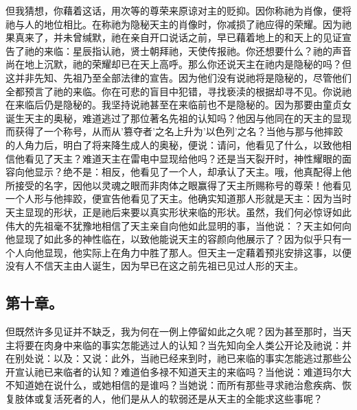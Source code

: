 但我猜想，你藉着这话，用次等的尊荣来原谅对主的贬抑。因你称祂为肖像，便将祂与人的地位相比。在称祂为隐秘天主的肖像时，你减损了祂应得的荣耀。因为祂果真来了，并未曾缄默，祂在亲自开口说话之前，早已藉着地上的和天上的见证宣告了祂的来临：星辰指认祂，贤士朝拜祂，天使传报祂。你还想要什么？祂的声音尚在地上沉默，祂的荣耀却已在天上高呼。那么你还说天主在祂内是隐秘的吗？但这并非先知、先祖乃至全部法律的宣告。因为他们没有说祂将是隐秘的，尽管他们全都预言了祂的来临。你在可悲的盲目中犯错，寻找亵渎的根据却寻不见。你说祂在来临后仍是隐秘的。我坚持说祂甚至在来临前也不是隐秘的。因为那要由童贞女诞生天主的奥秘，难道逃过了那位著名先祖的认知吗？他因与他同在的天主的显现而获得了一个称号，从而从'篡夺者'之名上升为'以色列'之名？当他与那与他摔跤的人角力后，明白了将来降生成人的奥秘，便说：请问，他看见了什么，以致他相信他看见了天主？难道天主在雷电中显现给他吗？还是当天裂开时，神性耀眼的面容向他显示？绝不是：相反，他看见了一个人，却承认了天主。哦，他真配得上他所接受的名字，因他以灵魂之眼而非肉体之眼赢得了天主所赐称号的尊荣！他看见一个人形与他摔跤，便宣告他看见了天主。他确实知道那人形就是天主：因为当时天主显现的形状，正是祂后来要以真实形状来临的形状。虽然，我们何必惊讶如此伟大的先祖毫不犹豫地相信了天主亲自向他如此显明的事，当他说：？天主如何向他显现了如此多的神性临在，以致他能说天主的容颜向他展示了？因为似乎只有一个人向他显现，他实际上在角力中胜了那人。但天主一定藉着预兆安排这事，以便没有人不信天主由人诞生，因为早已在这之前先祖已见过人形的天主。\par


\subsection{第十章。}

\par

但既然许多见证并不缺乏，我为何在一例上停留如此之久呢？因为甚至那时，当天主将要在肉身中来临的事实怎能逃过人的认知？当先知向全人类公开论及祂说：并在别处说：以及：又说：此外，当祂已经来到时，祂已来临的事实怎能逃过那些公开宣认祂已来临者的认知？难道伯多禄不知道天主的来临吗？当他说：难道玛尔大不知道她在说什么，或她相信的是谁吗？当她说：而所有那些寻求祂治愈疾病、恢复肢体或复活死者的人，他们是从人的软弱还是从天主的全能求这些事呢？\par

